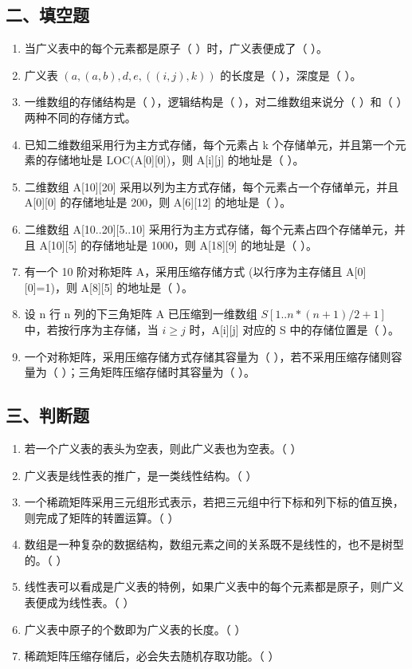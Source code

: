 \documentclass[12pt, a4paper]{article}
\begin{document}
\subsection*{二、填空题}
\begin{enumerate}
    \item 当广义表中的每个元素都是原子（ ）时，广义表便成了（ ）。
    \item 广义表 $(a, (a,b), d, e, ((i, j), k))$ 的长度是（ ），深度是（ ）。
    \item 一维数组的存储结构是（ ），逻辑结构是（ ），对二维数组来说分（ ）和（ ）两种不同的存储方式。
    \item 已知二维数组采用行为主方式存储，每个元素占 k 个存储单元，并且第一个元素的存储地址是 LOC(A[0][0])，则 A[i][j] 的地址是（ ）。
    \item 二维数组 A[10][20] 采用以列为主方式存储，每个元素占一个存储单元，并且 A[0][0] 的存储地址是 200，则 A[6][12] 的地址是（ ）。
    \item 二维数组 A[10..20][5..10] 采用行为主方式存储，每个元素占四个存储单元，并且 A[10][5] 的存储地址是 1000，则 A[18][9] 的地址是（ ）。
    \item 有一个 10 阶对称矩阵 A，采用压缩存储方式 (以行序为主存储且 A[0][0]=1)，则 A[8][5] 的地址是（ ）。
    \item 设 n 行 n 列的下三角矩阵 A 已压缩到一维数组 $S[1..n*(n+1)/2+1]$ 中，若按行序为主存储，当 $i \ge j$ 时，A[i][j] 对应的 S 中的存储位置是（ ）。
    \item 一个对称矩阵，采用压缩存储方式存储其容量为（ ），若不采用压缩存储则容量为（ ）；三角矩阵压缩存储时其容量为（ ）。
\end{enumerate}

\subsection*{三、判断题}
\begin{enumerate}
    \item 若一个广义表的表头为空表，则此广义表也为空表。（ ）
    \item 广义表是线性表的推广，是一类线性结构。（ ）
    \item 一个稀疏矩阵采用三元组形式表示，若把三元组中行下标和列下标的值互换，则完成了矩阵的转置运算。（ ）
    \item 数组是一种复杂的数据结构，数组元素之间的关系既不是线性的，也不是树型的。（ ）
    \item 线性表可以看成是广义表的特例，如果广义表中的每个元素都是原子，则广义表便成为线性表。（ ）
    \item 广义表中原子的个数即为广义表的长度。（ ）
    \item 稀疏矩阵压缩存储后，必会失去随机存取功能。（ ）
\end{enumerate}
\end{document}
